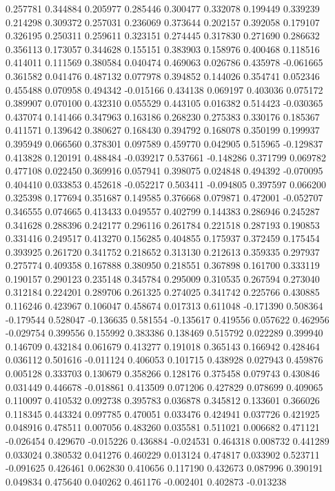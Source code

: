 0.257781
0.344884
0.205977
0.285446
0.300477
0.332078
0.199449
0.339239
0.214298
0.309372
0.257031
0.236069
0.373644
0.202157
0.392058
0.179107
0.326195
0.250311
0.259611
0.323151
0.274445
0.317830
0.271690
0.286632
0.356113
0.173057
0.344628
0.155151
0.383903
0.158976
0.400468
0.118516
0.414011
0.111569
0.380584
0.040474
0.469063
0.026786
0.435978
-0.061665
0.361582
0.041476
0.487132
0.077978
0.394852
0.144026
0.354741
0.052346
0.455488
0.070958
0.494342
-0.015166
0.434138
0.069197
0.403036
0.075172
0.389907
0.070100
0.432310
0.055529
0.443105
0.016382
0.514423
-0.030365
0.437074
0.141466
0.347963
0.163186
0.268230
0.275383
0.330176
0.185367
0.411571
0.139642
0.380627
0.168430
0.394792
0.168078
0.350199
0.199937
0.395949
0.066560
0.378301
0.097589
0.459770
0.042905
0.515965
-0.129837
0.413828
0.120191
0.488484
-0.039217
0.537661
-0.148286
0.371799
0.069782
0.477108
0.022450
0.369916
0.057941
0.398075
0.024848
0.494392
-0.070095
0.404410
0.033853
0.452618
-0.052217
0.503411
-0.094805
0.397597
0.066200
0.325398
0.177694
0.351687
0.149585
0.376668
0.079871
0.472001
-0.052707
0.346555
0.074665
0.413433
0.049557
0.402799
0.144383
0.286946
0.245287
0.341628
0.288396
0.242177
0.296116
0.261784
0.221518
0.287193
0.190853
0.331416
0.249517
0.413270
0.156285
0.404855
0.175937
0.372459
0.175454
0.393925
0.261720
0.341752
0.218652
0.313130
0.212613
0.359335
0.297937
0.275774
0.409358
0.167888
0.380950
0.218551
0.367898
0.161700
0.333119
0.190157
0.290123
0.235148
0.345784
0.295009
0.310535
0.267594
0.273040
0.312184
0.224201
0.289706
0.261325
0.274025
0.341742
0.225766
0.430885
0.116246
0.423967
0.106047
0.458674
0.017313
0.611048
-0.171390
0.508364
-0.179544
0.528047
-0.136635
0.581554
-0.135617
0.419556
0.057622
0.462956
-0.029754
0.399556
0.155992
0.383386
0.138469
0.515792
0.022289
0.399940
0.146709
0.432184
0.061679
0.413277
0.191018
0.365143
0.166942
0.428464
0.036112
0.501616
-0.011124
0.406053
0.101715
0.438928
0.027943
0.459876
0.005128
0.333703
0.130679
0.358266
0.128176
0.375458
0.079743
0.430846
0.031449
0.446678
-0.018861
0.413509
0.071206
0.427829
0.078699
0.409065
0.110097
0.410532
0.092738
0.395783
0.036878
0.345812
0.133601
0.366026
0.118345
0.443324
0.097785
0.470051
0.033476
0.424941
0.037726
0.421925
0.048916
0.478511
0.007056
0.483260
0.035581
0.511021
0.006682
0.471121
-0.026454
0.429670
-0.015226
0.436884
-0.024531
0.464318
0.008732
0.441289
0.033024
0.380532
0.041276
0.460229
0.013124
0.474817
0.033902
0.523711
-0.091625
0.426461
0.062830
0.410656
0.117190
0.432673
0.087996
0.390191
0.049834
0.475640
0.040262
0.461176
-0.002401
0.402873
-0.013238
